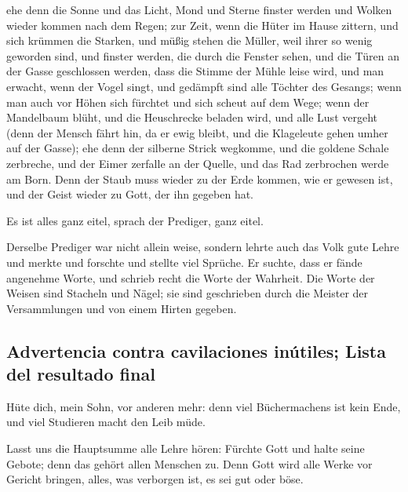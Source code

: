  ehe denn die Sonne und das Licht, Mond und Sterne finster
werden und Wolken wieder kommen nach dem Regen;  zur Zeit,
wenn die Hüter im Hause zittern, und sich krümmen die Starken, und müßig
stehen die Müller, weil ihrer so wenig geworden sind, und finster
werden, die durch die Fenster sehen,  und die Türen an der
Gasse geschlossen werden, dass die Stimme der Mühle leise wird, und man
erwacht, wenn der Vogel singt, und gedämpft sind alle Töchter des
Gesangs;  wenn man auch vor Höhen sich fürchtet und sich
scheut auf dem Wege; wenn der Mandelbaum blüht, und die Heuschrecke
beladen wird, und alle Lust vergeht (denn der Mensch fährt hin, da er
ewig bleibt, und die Klageleute gehen umher auf der Gasse);
 ehe denn der silberne Strick wegkomme, und die goldene
Schale zerbreche, und der Eimer zerfalle an der Quelle, und das Rad
zerbrochen werde am Born.  Denn der Staub muss wieder zu
der Erde kommen, wie er gewesen ist, und der Geist wieder zu Gott, der
ihn gegeben hat.

 Es ist alles ganz eitel, sprach der Prediger, ganz eitel.

 Derselbe Prediger war nicht allein weise, sondern lehrte
auch das Volk gute Lehre und merkte und forschte und stellte viel
Sprüche.  Er suchte, dass er fände angenehme Worte, und
schrieb recht die Worte der Wahrheit.  Die Worte der
Weisen sind Stacheln und Nägel; sie sind geschrieben durch die Meister
der Versammlungen und von einem Hirten gegeben.

\hypertarget{advertencia-contra-cavilaciones-inuxfatiles-lista-del-resultado-final}{%
\subsection{Advertencia contra cavilaciones inútiles; Lista del
resultado
final}\label{advertencia-contra-cavilaciones-inuxfatiles-lista-del-resultado-final}}

 Hüte dich, mein Sohn, vor anderen mehr: denn viel
Büchermachens ist kein Ende, und viel Studieren macht den Leib müde.

 Lasst uns die Hauptsumme alle Lehre hören: Fürchte Gott
und halte seine Gebote; denn das gehört allen Menschen zu.
 Denn Gott wird alle Werke vor Gericht bringen, alles,
was verborgen ist, es sei gut oder böse.

